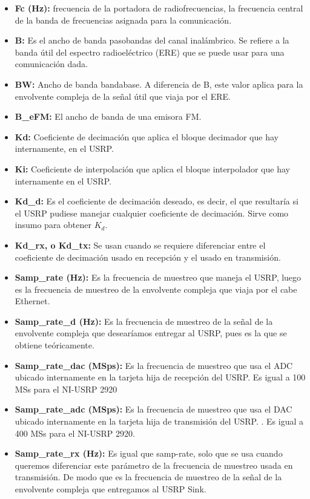 \begin{itemize}
	\item  \textbf{Fc (Hz):} frecuencia de la portadora de radiofrecuencias, la frecuencia central de la banda de frecuencias asignada para la comunicación.
	\item  \textbf{B:} Es el ancho de banda pasobandas del canal inalámbrico. Se refiere a la banda útil del espectro radioeléctrico (ERE) que se puede usar para una comunicación dada.
	\item  \textbf{BW:} Ancho de banda bandabase. A diferencia de B, este valor aplica para la envolvente compleja de la señal útil que viaja por el ERE.
	\item  \textbf{B\_eFM:} El ancho de banda de una emisora FM.
	\item  \textbf{Kd:}  Coeficiente de decimación que aplica el bloque decimador que hay internamente, en el USRP.
	\item  \textbf{Ki:}  Coeficiente de interpolación que aplica el bloque interpolador que hay internamente en el USRP.
	\item  \textbf{Kd\_d:}  Es el coeficiente de decimación deseado, es decir, el que resultaría si el USRP pudiese manejar cualquier coeficiente de decimación. Sirve como insumo para obtener $K_d$.
	\item  \textbf{Kd\_rx, o Kd\_tx:} Se usan cuando se requiere diferenciar entre el coeficiente de decimación usado en recepción y el usado en transmisión.
	\item  \textbf{Samp\_rate (Hz):} Es la frecuencia de muestreo que maneja el USRP, luego es la frecuencia de muestreo de la envolvente compleja que viaja por el cabe Ethernet. 
	\item  \textbf{Samp\_rate\_d (Hz):} Es la frecuencia de muestreo de la señal de la envolvente compleja  que desearíamos entregar al USRP, pues es la que se obtiene teóricamente.
	\item  \textbf{Samp\_rate\_dac (MSps):} Es la frecuencia de muestreo que usa el ADC ubicado internamente en la tarjeta hija de recepción del USRP. Es igual a 100 MSs para el NI-USRP 2920
	\item   \textbf{Samp\_rate\_adc (MSps):} Es la frecuencia de muestreo que usa el DAC ubicado internamente en la tarjeta hija de transmisión del USRP. . Es igual a 400 MSs para el NI-USRP 2920. 
	\item  \textbf{Samp\_rate\_rx (Hz):} Es igual que samp-rate, solo que se usa cuando queremos diferenciar este parámetro de la frecuencia de muestreo usada en transmisión. De modo que es la frecuencia de muestreo de la señal de la envolvente compleja  que entregamos al USRP Sink. 

\end{itemize}
